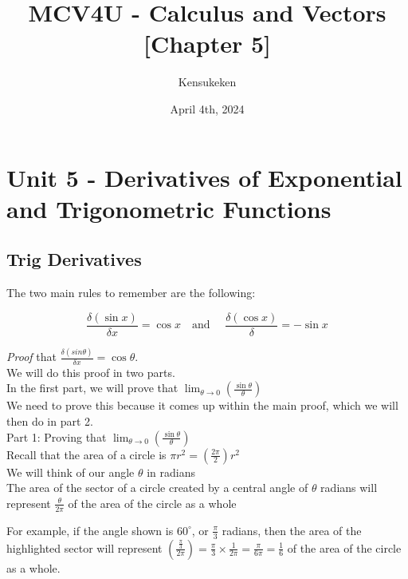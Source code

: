 \documentclass{article}
\title{MCV4U - Calculus and Vectors [Chapter 5]}
\author{Kensukeken}
\date{April 4th, 2024}
\begin{document}
\maketitle

\tableofcontents
\newpage
\section{Unit 5 - Derivatives of Exponential and Trigonometric Functions}
\subsection{Trig Derivatives }
The two main rules to remember are the following:
\begin{tcolorbox}[sharp corners=uphill,
    colback=purple!50!white,colframe=blue!25!black,coltext=yellow,
    fontupper=\Large\bfseries,arc=6mm,boxrule=2mm,boxsep=5mm]
$$\frac{\delta (\sin x)}{\delta x}=\cos x \quad \text{and } \quad \frac{\delta(\cos x)}{\delta}=-\sin x$$
\end{tcolorbox}
\textit{Proof} that $\frac{\delta (sin \theta)}{\delta x}=\cos \theta$.\\
We will do this proof in two parts. \\

In the first part, we will prove that  $\lim_{\theta \to 0}\left( \frac{\sin \theta }{\theta}\right)$\\

We need to prove this because it comes up within the main proof, which we will then do in part 2.\\

Part 1: Proving that $\lim_{\theta \to 0}\left( \frac{\sin \theta }{\theta}\right)$\\

Recall that the area of a circle is $\pi r^2=(\frac{2 \pi}{2})r^2$ \\
We will think of our angle $\theta$ in radians \\
The area of the sector of a circle created by a central angle of $\theta$ radians will represent $\frac{\theta}{2\pi}$ of the area of the circle as a whole \\

\begin{minipage}{0.5\textwidth}
For example, if the angle shown is $60^{\circ}$, or $\frac{\pi}{3}$ radians, then the area of the highlighted sector will represent $\left(\frac{\frac{\pi}{3}}{2\pi}\right)=\frac{\pi}{3}\times \frac{1}{2\pi}=\frac{\pi}{6\pi}=\frac{1}{6}$ of the area of the circle as a whole.
\end{minipage}
\hspace{1em}
\begin{minipage}{0.5\textwidth}
\end{minipage}
\end{document}
